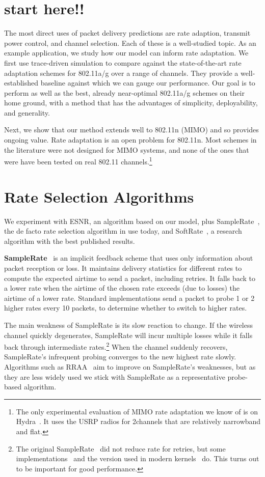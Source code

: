 \section{start here!!}
The most direct uses of packet delivery predictions are rate adaption, transmit power control, and channel selection. Each of these is a well-studied topic. As an example application, we study how our model can inform rate adaptation. We first use trace-driven simulation to compare against the state-of-the-art rate adaptation schemes for 802.11a/g over a range of channels. They provide a well-established baseline against which we can gauge our performance. Our goal is to perform as well as the best, already near-optimal 802.11a/g schemes on their home ground, with a method that has the advantages of simplicity, deployability, and generality.

Next, we show that our method extends well to 802.11n (MIMO) and so provides ongoing value. Rate adaptation is an open problem for 802.11n. Most schemes in the literature were not designed for MIMO systems, and none of the ones that were have been tested on real 802.11 channels.\footnote{The only experimental evaluation of MIMO rate adaptation we know of is on Hydra~\cite{Kim_Hydra}. It uses the USRP radios for 2\MHz channels that are relatively narrowband and flat.} 

\section{Rate Selection Algorithms}
We experiment with ESNR, an algorithm based on our model, plus SampleRate~\cite{Bicket_SampleRate}, the de facto rate selection algorithm in use today, and SoftRate~\cite{Vutukuru_SoftRate}, a research algorithm with the best published results.

\textbf{SampleRate}~\cite{Bicket_SampleRate} is an implicit feedback scheme that uses only information about packet reception or loss.
It maintains delivery statistics for different rates to compute the expected airtime to send a packet, including retries.
It falls back to a lower rate when the airtime of the chosen rate exceeds (due to losses) the airtime of a lower rate.
Standard implementations send a packet to probe 1 or 2 higher rates every 10 packets, to determine whether to switch to higher rates.

The main weakness of SampleRate is its slow reaction to change. If the wireless channel quickly degenerates, SampleRate will incur multiple losses while it falls back through intermediate rates.\footnote{The original SampleRate~\cite{Bicket_SampleRate} did not reduce rate for retries, but some implementations~\cite{Judd_CHARM} and the version used in modern kernels~\cite{Minstrel} do. This turns out to be important for good performance.} When the channel suddenly recovers, SampleRate's infrequent probing converges to the new highest rate slowly. Algorithms such as 
RRAA~\cite{Wong_RRAA} aim to improve on SampleRate's weaknesses, but as they are less widely used we stick with SampleRate as a representative probe-based algorithm.

